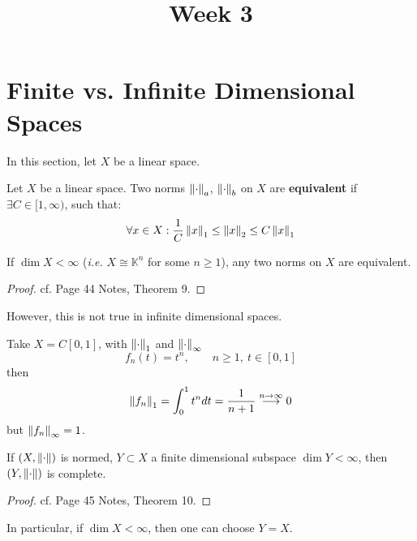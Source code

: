 \documentclass{article}
\title{Week 3}
\author{\aut}
\begin{document}
\maketitle

\section{Finite vs. Infinite Dimensional Spaces}

In this section, let $X$ be a linear space.  

\begin{definition}\label{equivalent norms}\rm\nextline
	Let $X$ be a linear space. Two norms $\left\|{\cdot}\right\|_a$, $\left\|{\cdot}\right\|_b$ on $X$ are {\bf equivalent} if $\exists C \in [1, \infty)$, such that:
 $$
    \forall x \in X: \frac{1}{C}\left\|{x}\right\|_1 \leq \left\|{x}\right\|_2 \leq C \left\|{x}\right\|_1
 $$
\end{definition}

\begin{proposition}\nextline
\label{Norms are equivalent in finite dim}
    If $\dim X < \infty$ (\textit{i.e.} $X \cong \mathbb{K}^n$ for some $n \geq 1$), any two norms on $X$ are equivalent.
\end{proposition}
\begin{proof}
    cf. Page 44 Notes, Theorem 9. 
\end{proof}

However, this is not true in infinite dimensional spaces.  

\begin{example}
    Take $X = C[0,1]$, with $\left\|{\cdot}\right\|_1$ and $\left\|{\cdot}\right\|_{\infty}$
    $$
    f_n(t) = t^n, \qquad n \geq 1, \ t\in [0,1]
    $$
    then  
    $$
    \left\|{f_n}\right\|_1 = \int_0^1 t^n dt = \frac{1}{n+1} \overset{n \to \infty}{\longrightarrow} 0
    $$
    but $\left\|{f_n}\right\|_{\infty}=1$.
\end{example}

\begin{proposition}
\label{finite dim is complete}
    If $(X, \left\|{\cdot}\right\|)$ is normed, $Y \subset X$ a finite dimensional subspace $\dim Y < \infty$, then $(Y, \left\|{\cdot}\right\|)$ is complete.
\end{proposition}  
\begin{proof}
    cf. Page 45 Notes, Theorem 10.
\end{proof}

\begin{remark}
In particular, if $\dim X < \infty$, then one can choose $Y=X$. 
\end{remark}  
\end{document}
